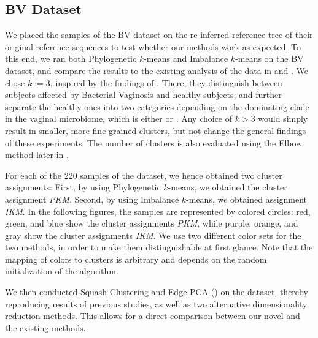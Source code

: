 
\subsection{BV Dataset}
\label{ch:Clustering:sec:Results:sub:BVDataset}

We placed the samples of the \ac{BV} dataset \cite{Srinivasan2012}
on the re-inferred reference tree of their original reference sequences
to test whether our methods work as expected.
To this end, we ran both Phylogenetic $k$-means and Imbalance $k$-means on the \ac{BV} dataset,
and compare the results to the existing analysis of the data in \cite{Srinivasan2012} and \cite{Matsen2011a}.
We chose $k:=3$, inspired by the findings of \cite{Srinivasan2012}.
There, they distinguish between subjects affected by Bacterial Vaginosis and healthy subjects,
and further separate the healthy ones into two categories depending on the dominating clade in the vaginal microbiome,
which is either  or .
Any choice of $k > 3$ would simply result in smaller, more fine-grained clusters,
but not change the general findings of these experiments.
The number of clusters is also evaluated using the Elbow method later in .

For each of the \num{220} samples of the dataset, we hence obtained two cluster assignments:
First, by using Phylogenetic $k$-means, we obtained the cluster assignment \emph{PKM}.
Second, by using Imbalance $k$-means, we obtained assignment \emph{IKM}.
In the following figures, the samples are represented by colored circles:
red, green, and blue show the cluster assignments \emph{PKM},
while purple, orange, and gray show the cluster assignments \emph{IKM}.
We use two different color sets for the two methods, in order to make them distinguishable at first glance.
Note that the mapping of colors to clusters is arbitrary and depends on the random initialization of the algorithm.

We then conducted Squash Clustering and Edge PCA ()
on the dataset, thereby reproducing results of previous studies,
as well as two alternative dimensionality reduction methods.
This allows for a direct comparison between our novel and the existing methods.

